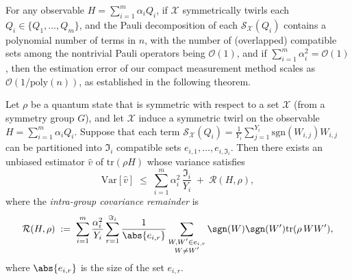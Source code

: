 \documentclass[prl,aps,notitlepage,superscriptaddress,showpacs,nofootinbib]{revtex4-2}
\begin{document}
For any observable $H = \sum_{i=1}^m \alpha_i Q_i$, 
if $\mathcal{X}$ symmetrically twirls each $Q_i \in \{Q_1,\ldots,Q_m\}$, 
and the Pauli decomposition of each $\mathcal{S}_{\mathcal{X}}(Q_i)$ contains a polynomial number of terms in $n$, 
with the number of (overlapped) compatible sets among the nontrivial Pauli operators being $\mathcal{O}(1)$, 
and if $\sum_{i=1}^m \alpha_i^2 = \mathcal{O}(1)$,  
then the estimation error of our compact measurement method scales as 
$\mathcal{O}(1/\mathrm{poly}(n))$, as established in the following theorem.
\begin{theorem}
Let $\rho$ be a quantum state that is symmetric with respect to a set $\mathcal{X}$ (from a symmetry group $G$), and let $\mathcal{X}$ induce a symmetric twirl on the observable $ H = \sum_{i=1}^m \alpha_i Q_i$.
Suppose that each term $\mathcal{S}_{\mathcal{X}}(Q_i)=\frac{1}{Y_i}\sum_{j=1}^{Y_i} \mathrm{sgn}(W_{i,j}) W_{i,j}$ can be partitioned into $\Im_i$ compatible sets $e_{i,1},\dots, e_{i,\Im_i}$.
Then there exists an unbiased estimator $\widehat{v}$ of $\text{tr}(\rho H)$ whose variance satisfies
\begin{equation}
    \mathrm{Var}[\widehat{v}]
\;\le\;
\sum_{i=1}^{m} \alpha_i^2\,\frac{\Im_i}{Y_i}
\;+\;
\mathcal{R}(H,\rho),
\label{eq:variance_full_version_supple}
\end{equation}
where the \emph{intra-group covariance remainder} is
\begin{equation}
  \mathcal{R}(H,\rho)
\;:=\;
\sum_{i=1}^m \frac{\alpha_i^2}{Y_i}
\sum_{r=1}^{\Im_i}\frac{1}{\abs{e_{i,r}}}
\sum_{\substack{W,W'\in e_{i,r}\\ W\neq W'}} \sgn(W)\sgn(W')
\text{tr}(\rho\,WW'),
\label{eq:remainder_convariance}
\end{equation}
where $\abs{e_{i,r}}$ is the size of the set $e_{i,r}$.
\label{supp_thm:variance_symmetric_est}
\end{theorem}
\end{document}
